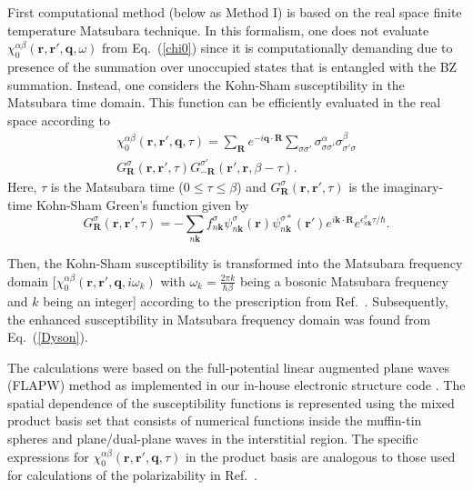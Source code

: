 First computational method (below as Method I) is based on the real space finite temperature Matsubara technique. In this formalism, one does not evaluate $\chi_0^{\alpha\beta}(\mathbf{r},\mathbf{r}',\mathbf{q},\omega)$ from Eq.~(\ref{chi0}) since it is computationally demanding due to presence of the summation over unoccupied states that is entangled with the BZ summation. Instead, one considers the Kohn-Sham susceptibility in the Matsubara time domain. This function can be efficiently evaluated in the real space according to
\begin{eqnarray}
\nonumber
\chi_{0}^{\alpha\beta}(\mathbf{r},\mathbf{r}',\mathbf{q},\tau)=\sum_{\mathbf{R}}e^{-i\mathbf{q}\cdot\mathbf{R}}\sum_{\sigma\sigma'}\sigma_{\sigma\sigma'}^{\alpha}\sigma_{\sigma'\sigma}^{\beta} \\
G^{\sigma}_{\mathbf{R}}(\mathbf{r},\mathbf{r}',\tau)G^{\sigma'}_{-\mathbf{R}}(\mathbf{r}',\mathbf{r},\beta-\tau).
\end{eqnarray}
Here, $\tau$ is the Matsubara time ($0\leq\tau\leq\beta$) and $G^{\sigma}_{\mathbf{R}}(\mathbf{r},\mathbf{r}',\tau)$ is the imaginary-time Kohn-Sham Green's function given by
\begin{equation}
G^{\sigma}_{\mathbf{R}}(\mathbf{r},\mathbf{r}',\tau)=-\sum_{n\mathbf{k}}f^{\sigma}_{n\mathbf{k}}\psi^\sigma_{n\mathbf{k}}(\mathbf{r})\psi^{\sigma*}_{n\mathbf{k}}(\mathbf{r}')e^{i\mathbf{k}\cdot\mathbf{R}}e^{\epsilon^{\sigma}_{n\mathbf{k}}\tau/\hbar}.
\label{gf}
\end{equation}

Then, the Kohn-Sham susceptibility is transformed into the Matsubara frequency domain [$\chi_{0}^{\alpha\beta}(\mathbf{r},\mathbf{r}',\mathbf{q},i\omega_k)$ with $\omega_k=\frac{2\pi k}{\hbar\beta}$ being a bosonic Matsubara frequency and $k$ being an integer] according to the prescription from Ref.~\citep{Kutepov2}. Subsequently, the enhanced susceptibility in Matsubara frequency domain was found from Eq.~(\ref{Dyson}).

The calculations were based on the full-potential linear augmented plane waves (FLAPW) method as implemented in our in-house electronic structure code \citep{Kutepov}. The spatial dependence of the susceptibility functions is represented using the mixed product basis set that consists of numerical functions inside the muffin-tin spheres and plane/dual-plane waves in the interstitial region.\citep{PB} The specific expressions for $\chi_{0}^{\alpha\beta}(\mathbf{r},\mathbf{r}',\mathbf{q},\tau)$ in the product basis are analogous to those used for calculations of the polarizability in Ref.~\citep{Kutepov2}. 

